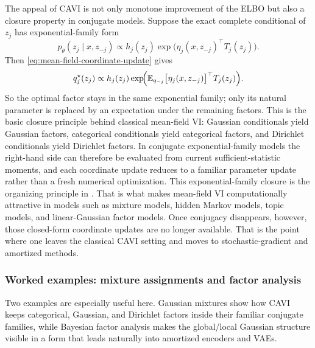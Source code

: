 The appeal of CAVI is not only monotone improvement of the ELBO but also a closure property in conjugate models.
Suppose the exact complete conditional of \(z_j\) has exponential-family form
\[
  p_\theta(z_j\mid x,z_{-j})
  \propto
  h_j(z_j)\exp\!\bigl(\eta_j(x,z_{-j})^\top T_j(z_j)\bigr).
\]
Then \eqref{eq:mean-field-coordinate-update} gives
\[
  q_j^\star(z_j)
  \propto
  h_j(z_j)\exp\!\Bigl(\mathbb{E}_{q_{-j}}\bigl[\eta_j(x,z_{-j})\bigr]^\top T_j(z_j)\Bigr).
\]
So the optimal factor stays in the same exponential family; only its natural parameter is replaced by an expectation under the remaining factors.
This is the basic closure principle behind classical mean-field VI:
Gaussian conditionals yield Gaussian factors, categorical conditionals yield categorical factors, and Dirichlet conditionals yield Dirichlet factors.
In conjugate exponential-family models the right-hand side can therefore be evaluated from current sufficient-statistic moments, and each coordinate update reduces to a familiar parameter update rather than a fresh numerical optimization.
This exponential-family closure is the organizing principle in \citet[\S4.1--4.2]{blei_kucukelbir_mcauliffe_2017_vi_review}.
That is what makes mean-field VI computationally attractive in models such as mixture models, hidden Markov models, topic models, and linear-Gaussian factor models.
Once conjugacy disappears, however, those closed-form coordinate updates are no longer available.
That is the point where one leaves the classical CAVI setting and moves to stochastic-gradient and amortized methods.

\subsubsection{Worked examples: mixture assignments and factor analysis}

Two examples are especially useful here.
Gaussian mixtures show how CAVI keeps categorical, Gaussian, and Dirichlet factors inside their familiar conjugate families, while Bayesian factor analysis makes the global/local Gaussian structure visible in a form that leads naturally into amortized encoders and VAEs.

